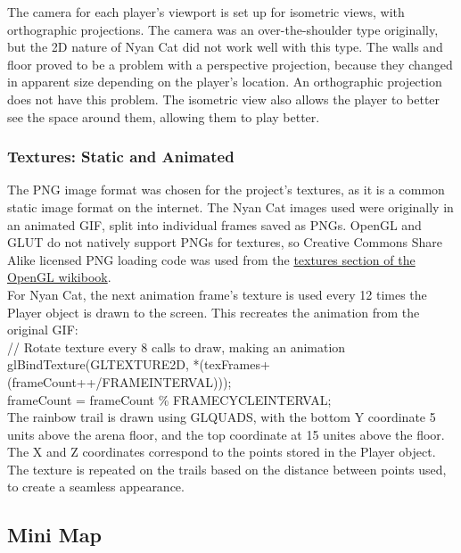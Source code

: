 \documentclass[12pt]{article}
\begin{document}
The camera for each player's viewport is set up for isometric views, with orthographic projections.  The camera was an over-the-shoulder type originally, but the 2D nature of Nyan Cat did not work well with this type.  The walls and floor proved to be a problem with a perspective projection, because they changed in apparent size depending on the player's location. An orthographic projection does not have this problem.  The isometric view also allows the player to better see the space around them, allowing them to play better.

\subsubsection{Textures: Static and Animated}

The PNG image format was chosen for the project's textures, as it is a common static image format on the internet.  The Nyan Cat images used were originally in an animated GIF, split into individual frames saved as PNGs.  OpenGL and GLUT do not natively support PNGs for textures, so Creative Commons Share Alike licensed PNG loading code was used from the \href{http://en.wikibooks.org/wiki/OpenGL_Programming/Intermediate/Textures#A_simple_libpng_example}{textures section of the OpenGL wikibook}. \\

For Nyan Cat, the next animation frame's texture is used every 12 times the Player object is drawn to the screen.  This recreates the animation from the original GIF:\\

\indent //	Rotate texture every 8 calls to draw, making an animation\\
\indent	glBindTexture(GL\textunderscore TEXTURE\textunderscore 2D, *(texFrames+(frameCount++/FRAME\textunderscore INTERVAL)));\\
\indent	frameCount = frameCount \% FRAME\textunderscore CYCLE\textunderscore INTERVAL;\\

The rainbow trail is drawn using GL\textunderscore QUADS, with the bottom Y coordinate 5 units above the arena floor, and the top coordinate at 15 unites above the floor.  The X and Z coordinates correspond to the points stored in the Player object.  The texture is repeated on the trails based on the distance between points used, to create a seamless appearance.

\subsection{Mini Map}
\end{document}
